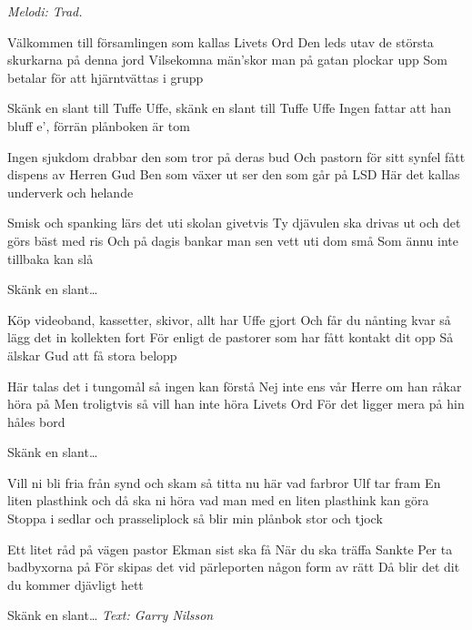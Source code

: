 {\footnotesize\textit{Melodi: Trad.}}\par
\vspace{10pt}
\par
Välkommen till församlingen som kallas Livets Ord
Den leds utav de största skurkarna på denna jord
Vilsekomna män’skor man på gatan plockar upp
Som betalar för att hjärntvättas i grupp

Skänk en slant till Tuffe Uffe, skänk en slant till Tuffe Uffe
Ingen fattar att han bluff e’, förrän plånboken är tom

Ingen sjukdom drabbar den som tror på deras bud
Och pastorn för sitt synfel fått dispens av Herren Gud
Ben som växer ut ser den som går på LSD
Här det kallas underverk och helande

Smisk och spanking lärs det uti skolan givetvis
Ty djävulen ska drivas ut och det görs bäst med ris
Och på dagis bankar man sen vett uti dom små
Som ännu inte tillbaka kan slå

Skänk en slant…

Köp videoband, kassetter, skivor, allt har Uffe gjort
Och får du nånting kvar så lägg det in kollekten fort
För enligt de pastorer som har fått kontakt dit opp
Så älskar Gud att få stora belopp

Här talas det i tungomål så ingen kan förstå
Nej inte ens vår Herre om han råkar höra på
Men troligtvis så vill han inte höra Livets Ord
För det ligger mera på hin håles bord

Skänk en slant…

Vill ni bli fria från synd och skam så titta nu här vad farbror Ulf tar fram
En liten plasthink och då ska ni höra vad man med en liten plasthink kan göra
Stoppa i sedlar och prasseliplock så blir min plånbok stor och tjock

Ett litet råd på vägen pastor Ekman sist ska få
När du ska träffa Sankte Per ta badbyxorna på
För skipas det vid pärleporten någon form av rätt
Då blir det dit du kommer djävligt hett

Skänk en slant…
\vspace{10pt}
{\footnotesize\textit{Text: Garry Nilsson}}
